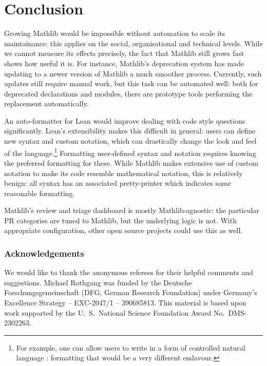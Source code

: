\documentclass[runningheads]{llncs}
\def\mathlib{Mathlib\xspace}
\begin{document}
\section{Conclusion}

Growing \mathlib would be impossible without automation to scale its maintainance: this applies on the social, organisational and technical levels.
While we cannot measure its effects precisely, the fact that \mathlib still grows fast shows how useful it is.
For instance, \mathlib's deprecation system has made updating to a newer version of \mathlib a much smoother process.
Currently, such updates still require manual work, but this task can be automated well: both for deprecated declarations and modules, there are prototype tools performing the replacement automatically.

An auto-formatter for Lean would improve dealing with code style questions significantly.
Lean's extensibility makes this difficult in general: users can define new syntax and custom notation, which can drastically change the look and feel of the language.\footnote{For example, one can allow users to write in a form of controlled natural language \cite{Massot24}: formatting that would be a very different endavour.}
Formatting user-defined syntax and notation requires knowing the preferred formatting for these.
While \mathlib makes extensive use of custom notation to make its code resemble mathematical notation, this is relatively benign: all syntax has an associated pretty-printer which indicates some reasonable formatting.

\mathlib's review and triage dashboard is mostly \mathlib-agnostic: the particular PR categories are tuned to \mathlib, but the underlying logic is not.
With appropriate configuration, other open source projects could use this as well.

\subsubsection*{Acknowledgements}
We would like to thank the anonymous referees for their helpful comments and suggestions.
Michael Rothgang was funded by the Deutsche Forschungsgemeinschaft (DFG, German Research Foundation) under Germany's Excellence Strategy -- EXC-2047/1 -- 390685813.
This material is based upon work supported by the U.~S.\ National Science Foundation Award No.\ DMS-2302263.

\printbibliography
\end{document}
